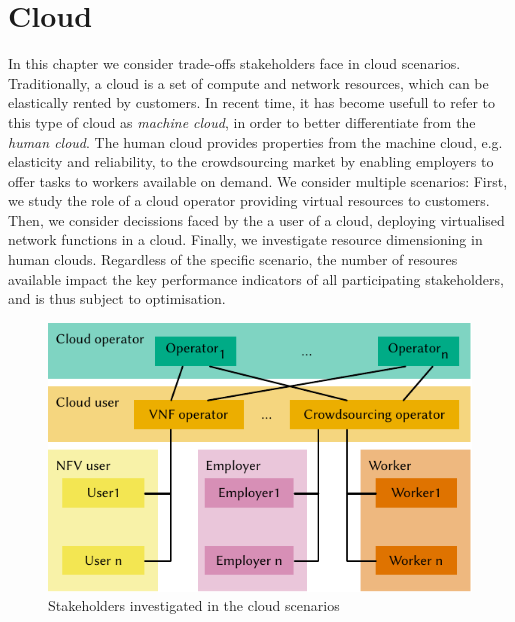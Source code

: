 \chapter{Cloud}\label{chap:cloud}

In this chapter we consider trade-offs stakeholders face in cloud scenarios.
Traditionally, a cloud is a set of compute and network resources, which can be elastically rented by customers.
In recent time, it has become usefull to refer to this type of cloud as \emph{machine cloud}, in order to better differentiate from the \emph{human cloud}.
The human cloud provides properties from the machine cloud, e.g. elasticity and reliability, to the crowdsourcing market by enabling employers to offer tasks to workers available on demand.
We consider multiple scenarios:
First, we study the role of a cloud operator providing virtual resources to customers.
Then, we consider decissions faced by the a user of a cloud, deploying virtualised network functions in a cloud.
Finally, we investigate resource dimensioning in human clouds.
Regardless of the specific scenario, the number of resoures available impact the key performance indicators of all participating stakeholders, and is thus subject to optimisation.

\begin{figure}
  \centering
  \includegraphics{cloud/figures/model}
  \caption{Stakeholders investigated in the cloud scenarios}
  \label{fig:cloud:model}
\end{figure}

